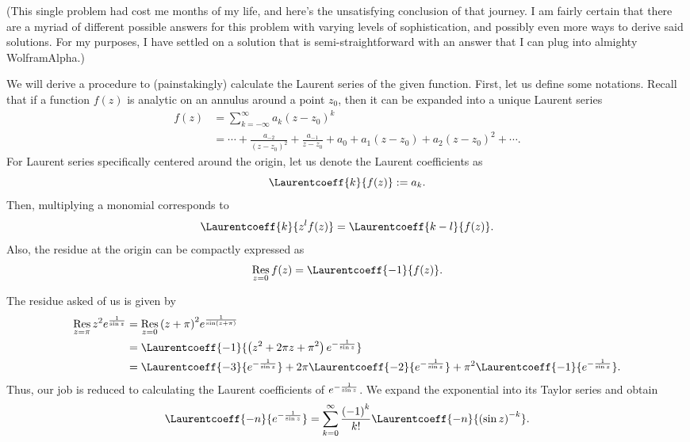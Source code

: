 \item[6.] %

(This single problem had cost me months of my life, and here's the unsatisfying conclusion of that journey.
I am fairly certain that there are a myriad of different possible answers for this problem with varying levels of sophistication,
and possibly even more ways to derive said solutions.
For my purposes, I have settled on a solution that is semi-straightforward with an answer that I can plug into almighty WolframAlpha.)

We will derive a procedure to (painstakingly) calculate the Laurent series of the given function.
First, let us define some notations.
Recall that if a function $f(z)$ is analytic on an annulus around a point $z_0$,
then it can be expanded into a unique Laurent series
\begin{align*}
    f(z)
    &= \sum_{k=-\infty}^\infty a_k {(z - z_0)}^k \\
    &= \cdots + \frac{a_{-2}}{{(z - z_0)}^2} + \frac{a_{-1}}{z - z_0}
     + a_0 + a_1 (z - z_0) + a_2 {(z - z_0)}^2 + \cdots.
\end{align*}
For Laurent series specifically centered around the origin,
let us denote the Laurent coefficients as
\[
    \Laurentcoeff{k}{f(z)} := a_k.
\]
Then, multiplying a monomial corresponds to
\[
    \Laurentcoeff{k}{z^l f(z)} = \Laurentcoeff{k - l}{f(z)}.
\]
Also, the residue at the origin can be compactly expressed as
\[
    \res{z=0}{f(z)} = \Laurentcoeff{-1}{f(z)}.
\]

The residue asked of us is given by
\begin{align*}
    \res{z=\pi}{z^2 e^{\inv{\sin z}}}
    &= \res{z=0}{{(z + \pi)}^2 e^{\inv{\sin (z + \pi)}}} \\
    &= \Laurentcoeff{-1}{\left( z^2 + 2\pi z + \pi^2 \right) e^{-\inv{\sin z}}} \\
    &= \Laurentcoeff{-3}{e^{-\inv{\sin z}}}
     + 2\pi \Laurentcoeff{-2}{e^{-\inv{\sin z}}}
     + \pi^2 \Laurentcoeff{-1}{e^{-\inv{\sin z}}}.
\end{align*}
Thus, our job is reduced to calculating the Laurent coefficients of $e^{-\frac{1}{\sin z}}$.
We expand the exponential into its Taylor series and obtain
\[
    \Laurentcoeff{-n}{e^{-\inv{\sin z}}}
    = \sum_{k=0}^\infty \frac{{(-1)}^k}{k!} \Laurentcoeff{-n}{{(\sin z)}^{-k}}.
\]

